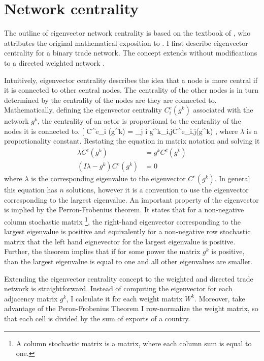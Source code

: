  \section{Network centrality}
The outline of eigenvector network centrality is based on the textbook of \textcite{jackson2010}, who attributes the original mathematical exposition to \textcite{Bonacich77}.
I first describe eigenvector centrality for a binary trade network.
The concept extends without modifications to a directed weighted network  \parencite{jackson2010}.  \par
Intuitively, eigenvector centrality describes the idea that a node is more central if it is connected to other central nodes.
The centrality of the other nodes is in turn determined by the centrality of the nodes are they are connected to.
Mathematically, defining the eigenvector centrality $C^e_i (g^k)$ associated with the network $g^k$, the centrality of an actor is proportional to the centrality of the nodes it is connected to.
[  \lambda C^e_i (g^k) = \sum_{j \neq i}  g^k_{i,j}C^e_{i,j}(g^k)  \]
, where $\lambda$ is a proportionality constant.
Restating the equation in matrix notation and solving it
\begin{align*}
 \lambda C^e (g^k) & =  g^k C^e (g^k) \\
( I  \lambda-g^k) C^e(g^k) & = 0
 \end{align*}
where $ \lambda$ is the corresponding eigenvalue to the eigenvector $C^e(g^k)$.
In general this equation has $n$ solutions, however it is a convention to use the eigenvector corresponding to the largest eigenvalue.
An important property of the eigenvector is implied by the Perron-Frobenius theorem.
It states that for a non-negative column stochastic matrix
 \footnote{A column stochastic matrix is a matrix, where each column sum is equal to one.}, the right-hand eigenvector corresponding to the largest eigenvalue is positive
 and equivalently for a non-negative row stochastic matrix that the left hand  eignevector for the largest eigenvalue is positive.
Further, the theorem implies that if for some power the matrix $g^k$ is positive, than the largest eigenvalue is equal to one and all other eigenvalues are smaller.
 \par
Extending the eigenvector centrality concept to the weighted and directed trade network is straightforward.
Instead of computing the eigenvector for each adjacency matrix $g^k$, I calculate it for each weight matrix $W^k$.
Moreover, take advantage of the Peron-Frobenius Theorem I row-normalize the weight matrix, so that each cell is divided by the sum of exports of a country.
